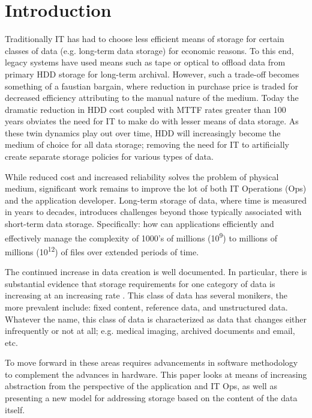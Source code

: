 \section{Introduction}

Traditionally IT has had to choose less efficient means of storage for
certain classes of data (e.g. long-term data storage) for economic
reasons. To this end, legacy systems have used means such as tape or
optical to offload data from primary HDD storage for long-term archival.
However, such a trade-off becomes something of a faustian bargain, where
reduction in purchase price is traded for decreased efficiency
attributing to the manual nature of the medium. Today the dramatic
reduction in HDD cost \cite{ref1} coupled with MTTF rates greater than 100
years \cite{ref2} obviates the need for IT to make do with lesser means of
data storage. As these twin dynamics play out over time, HDD will
increasingly become the medium of choice for all data storage; removing
the need for IT to artificially create separate storage policies for
various types of data.

While reduced cost and increased reliability solves the problem of
physical medium, significant work remains to improve the lot of both IT
Operations (Ops) and the application developer. Long-term storage of
data, where time is measured in years to decades, introduces challenges
beyond those typically associated with short-term data storage.
Specifically: how can applications efficiently and effectively manage
the complexity of 1000's of millions (10\textsuperscript{9}) to millions
of millions (10\textsuperscript{12}) of files over extended periods of
time.

The continued increase in data creation is well documented. In
particular, there is substantial evidence that storage requirements for
one category of data is increasing at an increasing rate \cite{ref5,ref6}.
This class of data has several monikers, the more prevalent include:
fixed content, reference data, and unstructured data. Whatever the name,
this class of data is characterized as data that changes either
infrequently or not at all; e.g. medical imaging, archived documents and
email, etc.

To move forward in these areas requires advancements in software
methodology to complement the advances in hardware. This paper looks at
means of increasing abstraction from the perspective of the application
and IT Ops, as well as presenting a new model for addressing storage
based on the content of the data itself.
